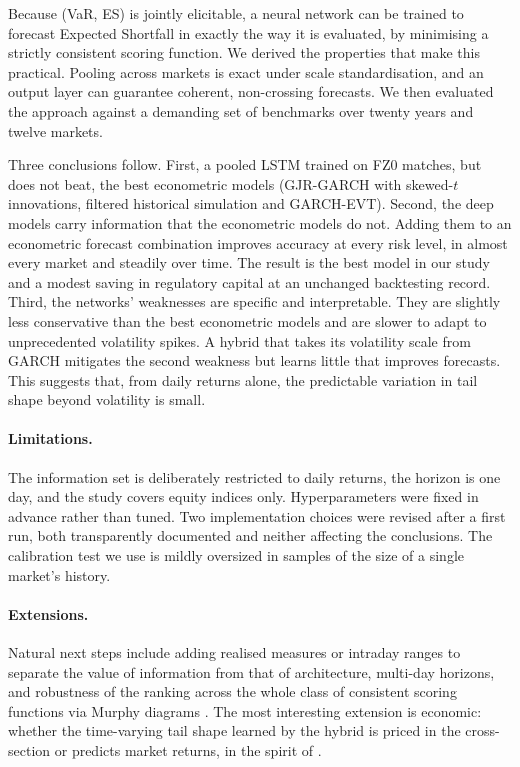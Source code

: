Because (VaR, ES) is jointly elicitable, a neural network can be trained to forecast Expected Shortfall in exactly the way it is evaluated, by minimising a strictly consistent scoring function. We derived the properties that make this practical. Pooling across markets is exact under scale standardisation, and an output layer can guarantee coherent, non-crossing forecasts. We then evaluated the approach against a demanding set of benchmarks over twenty years and twelve markets.

Three conclusions follow. First, a pooled LSTM trained on FZ0 matches, but does not beat, the best econometric models (GJR-GARCH with skewed-$t$ innovations, filtered historical simulation and GARCH-EVT). Second, the deep models carry information that the econometric models do not. Adding them to an econometric forecast combination improves accuracy at every risk level, in almost every market and steadily over time. The result is the best model in our study and a modest saving in regulatory capital at an unchanged backtesting record. Third, the networks' weaknesses are specific and interpretable. They are slightly less conservative than the best econometric models and are slower to adapt to unprecedented volatility spikes. A hybrid that takes its volatility scale from GARCH mitigates the second weakness but learns little that improves forecasts. This suggests that, from daily returns alone, the predictable variation in tail shape beyond volatility is small.

\paragraph{Limitations.} The information set is deliberately restricted to daily returns, the horizon is one day, and the study covers equity indices only. Hyperparameters were fixed in advance rather than tuned. Two implementation choices were revised after a first run, both transparently documented and neither affecting the conclusions. The calibration test we use is mildly oversized in samples of the size of a single market's history.

\paragraph{Extensions.} Natural next steps include adding realised measures or intraday ranges to separate the value of information from that of architecture, multi-day horizons, and robustness of the ranking across the whole class of consistent scoring functions via Murphy diagrams \citep{ziegel2020robust}. The most interesting extension is economic: whether the time-varying tail shape learned by the hybrid is priced in the cross-section or predicts market returns, in the spirit of \citet{kelly2014tail}.
